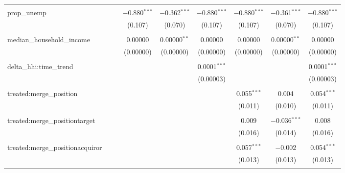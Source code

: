 \begin{table}[H]
{\begin{tabular}{@{\extracolsep{5pt}}lcccccccc}
   & & & & & & & & \\  

  prop\_unemp &  &  & $-$0.880$^{***}$ & $-$0.362$^{***}$ & $-$0.880$^{***}$ & $-$0.880$^{***}$ & $-$0.361$^{***}$ & $-$0.880$^{***}$ \\  

   &  &  & (0.107) & (0.070) & (0.107) & (0.107) & (0.070) & (0.107) \\  

   & & & & & & & & \\  

  median\_household\_income &  &  & 0.00000 & 0.00000$^{**}$ & 0.00000 & 0.00000 & 0.00000$^{**}$ & 0.00000 \\  

   &  &  & (0.00000) & (0.00000) & (0.00000) & (0.00000) & (0.00000) & (0.00000) \\  

   & & & & & & & & \\  

  delta\_hhi:time\_trend &  &  &  &  & 0.0001$^{***}$ &  &  & 0.0001$^{***}$ \\  

   &  &  &  &  & (0.00003) &  &  & (0.00003) \\  

   & & & & & & & & \\  

  treated:merge\_position &  &  &  &  &  & 0.055$^{***}$ & 0.004 & 0.054$^{***}$ \\  

   &  &  &  &  &  & (0.011) & (0.010) & (0.011) \\  

   & & & & & & & & \\  

  treated:merge\_positiontarget &  &  &  &  &  & 0.009 & $-$0.036$^{***}$ & 0.008 \\  

   &  &  &  &  &  & (0.016) & (0.014) & (0.016) \\  

   & & & & & & & & \\  

  treated:merge\_positionacquiror &  &  &  &  &  & 0.057$^{***}$ & $-$0.002 & 0.054$^{***}$ \\  

   &  &  &  &  &  & (0.013) & (0.013) & (0.013) \\  

   & & & & & & & & \\  


\end{tabular}}
\end{table}
